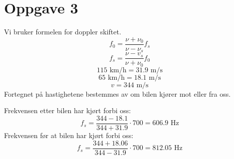 \documentclass[norsk]{article}
\begin{document}
\section*{Oppgave 3}
Vi bruker formelen for doppler skiftet. 
\[
f_0 = \frac{ν + ν_0}{ν - ν_s} f_s
\]
\[
f_s = \frac{ν - v_s}{ν + ν_0} f_0
\]
\[
115 \text{ km/h} = 31.9 \text{ m/s}
\]
\[
65 \text{ km/h} = 18.1 \text{ m/s}
\]
\[
v = 344 \text{ m/s}
\]
Fortegnet på hastighetene bestemmes av om bilen kjører mot eller fra oss. 

Frekvensen etter bilen har kjørt forbi oss:
\[
f_s = \frac{344 - 18.1}{344 + 31.9} ⋅ 700 = 606.9 \text{ Hz}
\]
Frekvensen før at bilen har kjørt forbi oss:
\[
f_s = \frac{344 + 18.06}{344 - 31.9} ⋅ 700 = 812.05 \text{ Hz}
\]
\end{document}

